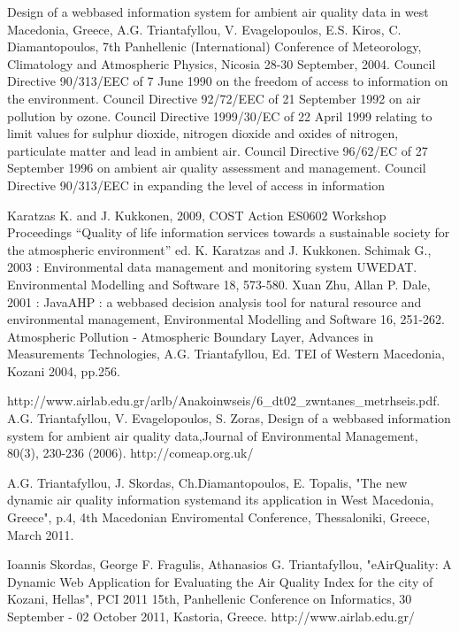 \documentclass[conference]{IEEEtran}
\begin{document}
\begin{thebibliography}{1}

 Design of a web\-based information system for ambient air quality data in west Macedonia, Greece, A.G. Triantafyllou, V. Evagelopoulos, E.S. Kiros, C. Diamantopoulos, 7th Panhellenic (International) Conference of Meteorology, Climatology and Atmospheric Physics, Nicosia 28-30 September, 2004.
Council Directive 90/313/EEC of 7 June 1990 on the freedom of access to information on the environment. 
Council Directive 92/72/EEC of 21 September 1992 on air pollution by ozone.
Council Directive 1999/30/EC of 22 April 1999 relating to limit values for sulphur dioxide, nitrogen dioxide and oxides of nitrogen, particulate matter and lead in ambient air.
Council Directive 96/62/EC of 27 September 1996 on ambient air quality assessment and management. 
Council Directive 90/313/ΕEC in expanding the level of access in information

 Karatzas K. and J. Kukkonen, 2009,  COST Action ES0602 Workshop Proceedings “Quality of life information services towards a sustainable society for the atmospheric environment” ed. K. Karatzas and J. Kukkonen. 
Schimak G., 2003 : Environmental data management and monitoring system UWEDAT. Environmental Modelling and Software 18, 573-580.
 Xuan Zhu, Allan P. Dale, 2001 : JavaAHP : a web\-based decision analysis tool for natural resource and environmental management, Environmental Modelling and Software 16, 251-262.
 Atmospheric Pollution - Atmospheric Boundary Layer, Advances in Measurements Technologies, A.G. Triantafyllou, Ed. TEI of Western Macedonia, Kozani 2004, pp.256.

 http://www.airlab.edu.gr/arlb/Anakoinwseis/6\_dt02\_zwntanes\_metrhseis.pdf.
A.G. Triantafyllou, V. Evagelopoulos, S. Zoras, Design of a web\-based information system for ambient air quality data,Journal of Environmental Management, 80(3), 230-236 (2006).
 http://comeap.org.uk/
 
 A.G. Triantafyllou, J. Skordas, Ch.Diamantopoulos, E. Topalis, "The new dynamic air quality information systemand its application in West Macedonia, Greece", p.4, 4th Macedonian Enviromental Conference, Thessaloniki, Greece, March 2011. 


 Ioannis Skordas, George F. Fragulis, Athanasios G. Triantafyllou, "e\-AirQuality: A Dynamic Web Application for Evaluating the Air Quality Index for the city of Kozani, Hellas", PCI 2011 15th, Panhellenic Conference on Informatics, 30 September - 02 October  2011, Kastoria, Greece.
	http://www.airlab.edu.gr/



\end{thebibliography}
\end{document}
